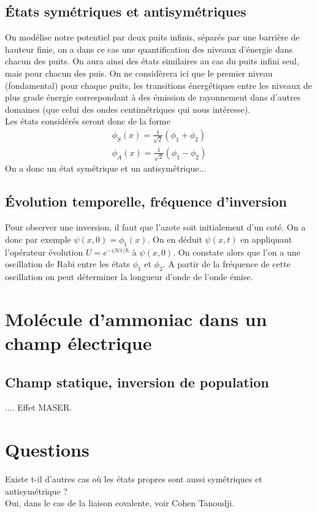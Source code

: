 \documentclass[12pt,prb,aps,epsf]{report}
\begin{document}
\subsection{États symétriques et antisymétriques}
On modélise notre potentiel par deux puits infinis, séparés par une barrière de hauteur finie, on a dans ce cas une quantification des niveaux d'énergie dans chacun des puits. On aura ainsi des états similaires au cas du puits infini seul, mais pour chacun des puis. On ne considèrera ici que le premier niveau (fondamental) pour chaque puits, les transitions énergétiques entre les niveaux de plus grade énergie correspondant à des émission de rayonnement dans d'autres domaines (que celui des ondes centimétriques qui nous intéresse). \\
Les états considérés seront donc de la forme 
\begin{eqnarray}
\phi_S(x)  = \frac{1}{\sqrt{2}} \left(\phi_1+\phi_2\right)\\
\phi_A(x)  = \frac{1}{\sqrt{2}} \left(\phi_1-\phi_2\right)
\end{eqnarray}
	On a donc un état symétrique et un antisymétrique...
	
\subsection{Évolution temporelle, fréquence d'inversion}
Pour observer une inversion, il faut que l'azote soit initialement d'un coté.
On a donc par exemple $\psi(x,0) = \phi_1(x)$. On en déduit $\psi(x,t)$ en appliquant l'opérateur évolution $U = e^{-i\mathcal{H}t/\hbar}$ à $\psi(x,0)$. On constate alors que l'on a une oscillation de Rabi entre les états $\phi_1$ et $\phi_2$. A partir de la fréquence de cette oscillation on peut déterminer la longueur d'onde de l'onde émise.

\section{Molécule d'ammoniac dans un champ électrique}
\subsection{Champ statique, inversion de population}
.... Effet MASER.

\section*{Questions}
Existe t-il d'autres cas où les états propres sont aussi symétriques et antisymétrique ?\\
Oui, dans le cas de la liaison covalente, voir Cohen Tanoudji.
\end{document}
